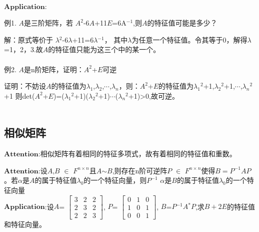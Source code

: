 \documentclass[lang=cn,10pt]{elegantbook}
\begin{document}
~\\

$\mathbf{Application}$:

例1.  $\mathit{A}$是三阶矩阵，若
$\mathit{A}^{2}$-6$\mathit{A}$+11$\mathit{E}$=6A$^{-1} $,则$\mathit{A}$的特征值可能是多少？

解：原式等价于 $\lambda$$^{2}$-6$\lambda$+11=6$\lambda$$^{-1} $，
其中$\lambda$为任意一个特征值。令其等于0，解得$\lambda$=1，2，3.故$\mathit{A}$的特征值只能为这三个中的某一个。
~\\
~\\


例2.      $\mathit{A}$是n阶矩阵，证明：$\mathit{A}^{2}$+$\mathit{E}$可逆

证明：不妨设$\mathit{A}$的特征值为$\lambda$$_{1}$,$\lambda$$_{2}$,$\cdots$,$\lambda$$_{n}$，则：$\mathit{A}^{2}$+$\mathit{E}$的特征值为$\lambda$$_{1}$$^{2}$+1,$\lambda$$_{2}$$^{2}$+1,$\cdots$,$\lambda$$_{n}$$^{2}$+1
则det($\mathit{A}^{2}$+$\mathit{E}$)=($\lambda$$_{1}$$^{2}$+1)($\lambda$$_{2}$$^{2}$+1)$\cdots$($\lambda$$_{n}$$^{2}$+1)>0,故可逆。
~\\
~\\

\subsection{相似矩阵}
  $\mathbf{Attention}$:相似矩阵有着相同的特征多项式，故有着相同的特征值和重数。
  
  $\mathbf{Attention}$:设$\mathit{A}$,$\mathit{B}$ $\in$ $\mathit{F^{n\times n} }$且$\mathit{A}$$\sim$$\mathit{B}$,则存在n阶可逆阵$\mathit{P}$ $\in$ $\mathit{F^{n\times n} }$使得$\mathit{B=P^{-1}AP}$。若$\alpha$是$\mathit{A}$的属于特征值$\lambda$$_{0}$的一个特征向量，则$\mathit{P^{-1}}$  $\alpha$是$\mathit{B}$的属于特征值$\lambda$$_{0}$的一个特征向量
  ~\\
  
   $\mathbf{Application}$:设$\mathit{A}$=
   $\begin{bmatrix}
   	3& 2 & 2\\
   	2 & 3 & 2\\
   	2& 2 &3
   \end{bmatrix}$,
   $\mathit{P}$=
   $\begin{bmatrix}
   	0& 1 & 0\\
   	1 & 0 & 1\\
   	0& 0 &1
   \end{bmatrix}$,
   $\mathit{B}$=$\mathit{P}$$^{-1}$$\mathit{A}$$^{*}$$\mathit{P}$,求$\mathit{B+2E}$的特征值和特征向量。
   
\end{document}

